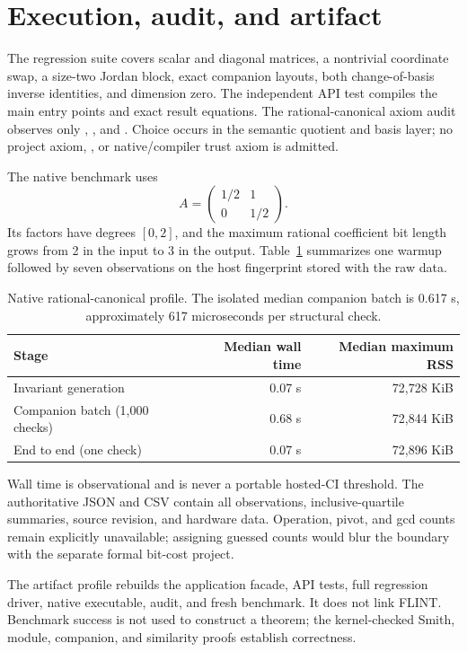 \section{Execution, audit, and artifact}

The regression suite covers scalar and diagonal matrices, a nontrivial
coordinate swap, a size-two Jordan block, exact companion layouts, both
change-of-basis inverse identities, and dimension zero.  The independent API
test compiles the main entry points and exact result equations.  The
rational-canonical axiom audit observes only ,
, and .  Choice occurs in the semantic
quotient and basis layer; no project axiom, , or native/compiler
trust axiom is admitted.

The native benchmark uses
\[
  A=\begin{pmatrix}1/2&1\\0&1/2\end{pmatrix}.
\]
Its factors have degrees $[0,2]$, and the maximum rational coefficient bit
length grows from 2 in the input to 3 in the output.  Table~\ref{tab:bench}
summarizes one warmup followed by seven observations on the host fingerprint
stored with the raw data.

\begin{table}[h]
\centering
\begin{tabular}{lrr}
\toprule
Stage & Median wall time & Median maximum RSS\\
\midrule
Invariant generation & 0.07 s & 72,728 KiB\\
Companion batch (1,000 checks) & 0.68 s & 72,844 KiB\\
End to end (one check) & 0.07 s & 72,896 KiB\\
\bottomrule
\end{tabular}
\caption{Native rational-canonical profile.  The isolated median companion
batch is 0.617 s, approximately 617 microseconds per structural check.}
\label{tab:bench}
\end{table}

Wall time is observational and is never a portable hosted-CI threshold.  The
authoritative JSON and CSV contain all observations, inclusive-quartile
summaries, source revision, and hardware data.  Operation, pivot, and gcd
counts remain explicitly unavailable; assigning guessed counts would blur
the boundary with the separate formal bit-cost project.

The artifact profile rebuilds the application facade, API tests, full
regression driver, native executable, audit, and fresh benchmark.  It does
not link FLINT.  Benchmark success is not used to construct a theorem; the
kernel-checked Smith, module, companion, and similarity proofs establish
correctness.

